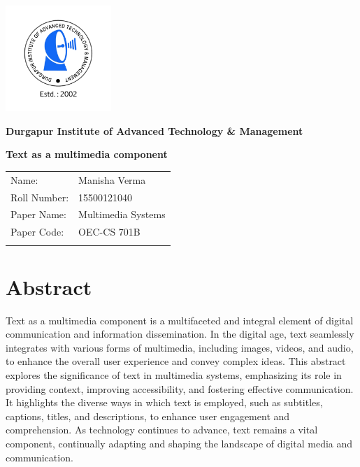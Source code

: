 \documentclass[12pt]{report}
\begin{document}
\begin{titlepage}
    \centering
    \includegraphics[width=4cm]{transparent logo.png}

    \Large \textbf{Durgapur Institute of Advanced Technology \& Management}
    \vspace{6cm}

    \Large \textbf{Text as a multimedia component}\par
    \vspace{1cm}
    
    \large
    \begin{tabular}{l l}
        Name: & Manisha Verma \\
        Roll Number: & 15500121040 \\
        Paper Name: & Multimedia Systems \\
        Paper Code: & OEC-CS 701B \\ \\
    \end{tabular}
\end{titlepage}

\tableofcontents

\newpage
\section*{Abstract}
Text as a multimedia component is a multifaceted and integral element of digital communication and information dissemination. In the digital age, text seamlessly integrates with various forms of multimedia, including images, videos, and audio, to enhance the overall user experience and convey complex ideas. This abstract explores the significance of text in multimedia systems, emphasizing its role in providing context, improving accessibility, and fostering effective communication. It highlights the diverse ways in which text is employed, such as subtitles, captions, titles, and descriptions, to enhance user engagement and comprehension. As technology continues to advance, text remains a vital component, continually adapting and shaping the landscape of digital media and communication.
\end{document}
